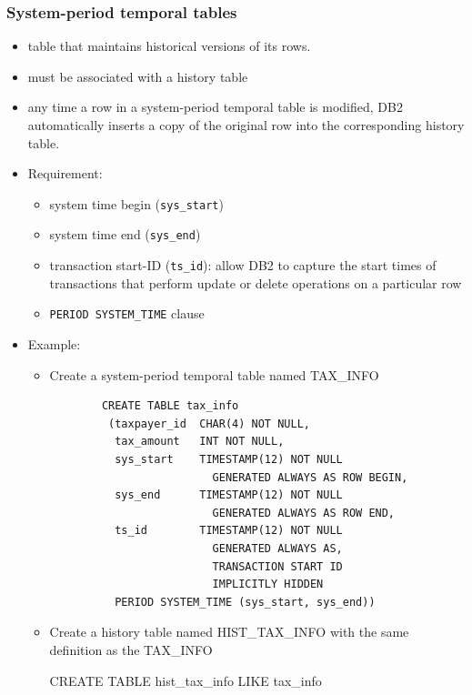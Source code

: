 \documentclass{article}
\begin{document}
\subsubsection{System-period temporal tables}
\begin{itemize}
\item table that maintains historical versions of its rows. 
\item must be associated with a history table
\item any time a row in a system-period temporal table is modified, DB2 automatically inserts a copy of
the original row into the corresponding history table.
\item Requirement:
	\begin{itemize}
		\item system time begin (\texttt{sys\_start})
		\item system time end (\texttt{sys\_end})
		\item transaction start-ID (\texttt{ts\_id}): allow DB2 to capture the start times of transactions that perform update or delete operations on a particular row
		\item \texttt{PERIOD SYSTEM\_TIME} clause
	\end{itemize}
\item Example:
	\begin{itemize}
	\item Create a system-period temporal table named TAX\_INFO
    \begin{verbatim}
		CREATE TABLE tax_info
		 (taxpayer_id  CHAR(4) NOT NULL,
		  tax_amount   INT NOT NULL,
		  sys_start    TIMESTAMP(12) NOT NULL
						 GENERATED ALWAYS AS ROW BEGIN,
		  sys_end      TIMESTAMP(12) NOT NULL
						 GENERATED ALWAYS AS ROW END,
		  ts_id        TIMESTAMP(12) NOT NULL
						 GENERATED ALWAYS AS,
						 TRANSACTION START ID
						 IMPLICITLY HIDDEN
		  PERIOD SYSTEM_TIME (sys_start, sys_end))
    \end{verbatim}
    
    \item Create a history table named HIST\_TAX\_INFO with the same definition as the TAX\_INFO
    \begin{sqlcode}
    CREATE TABLE hist_tax_info LIKE tax_info
    \end{sqlcode}
    

\end{itemize}
\end{itemize}
\end{document}
